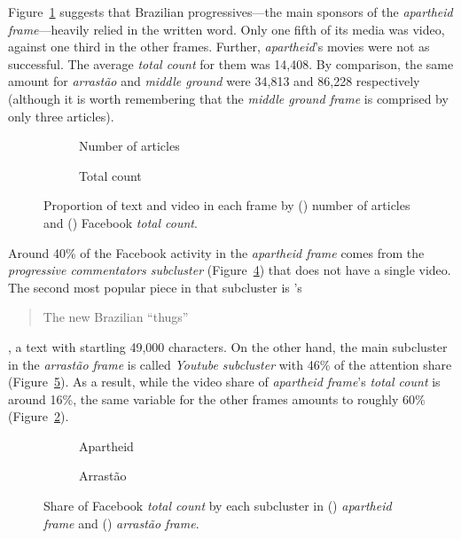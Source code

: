 Figure~\ref{fig:cap4-2a} suggests that Brazilian progressives---the main sponsors of the \emph{apartheid frame}---heavily relied in the written word. Only one fifth of its media was video, against one third in the other frames. Further, \emph{apartheid}'s movies were not as successful. The average \emph{total count} for them was 14,408. By comparison, the same amount for \emph{arrastão} and \emph{middle ground} were 34,813 and 86,228 respectively (although it is worth remembering that the \emph{middle ground frame} is comprised by only three articles).

\begin{figure}
\begin{subfigure}[b]{0.45\textwidth}
\caption{Number of articles}\label{fig:cap4-2a}

\end{subfigure}
\begin{subfigure}[b]{0.45\textwidth}
\caption{Total count}\label{fig:cap4-2b}

\end{subfigure}
\caption{Proportion of text and video in each frame by () number of articles and () Facebook \emph{total count}.}\label{fig:cap4-2}
\end{figure} 

Around 40\% of the Facebook activity in the \emph{apartheid frame} comes from the \emph{progressive commentators subcluster} (Figure~\ref{fig:cap4-3a}) that does not have a single video. The second most popular piece in that subcluster is \citeauthor{brum_vandalos}'s \blockcquote{brum_vandalos}{The new Brazilian \enquote{thugs}}, a text with startling 49,000 characters. On the other hand, the main subcluster in the \emph{arrastão frame} is called \emph{Youtube subcluster} with 46\% of the attention share (Figure~\ref{fig:cap4-3b}). As a result, while the video share of \emph{apartheid frame}'s \emph{total count} is around 16\%, the same variable for the other frames amounts to roughly 60\% (Figure~\ref{fig:cap4-2b}).

\begin{figure}
\begin{subfigure}[b]{0.5\textwidth}
\centering
\caption{Apartheid}\label{fig:cap4-3a}

\end{subfigure}
\begin{subfigure}[b]{0.5\textwidth}
\centering
\caption{Arrastão}\label{fig:cap4-3b}

\end{subfigure}
\caption{Share of Facebook \emph{total count} by each subcluster in () \emph{apartheid frame} and () \emph{arrastão frame}.}\label{fig:cap4-3}
\end{figure} 

